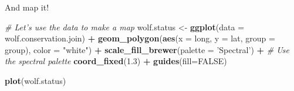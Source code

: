 \documentclass[]{article}
\newenvironment{Shaded}{\begin{snugshade}}{\end{snugshade}}
\newcommand{\CommentTok}[1]{\textcolor[rgb]{0.56,0.35,0.01}{\textit{#1}}}
\newcommand{\DataTypeTok}[1]{\textcolor[rgb]{0.13,0.29,0.53}{#1}}
\newcommand{\FloatTok}[1]{\textcolor[rgb]{0.00,0.00,0.81}{#1}}
\newcommand{\KeywordTok}[1]{\textcolor[rgb]{0.13,0.29,0.53}{\textbf{#1}}}
\newcommand{\NormalTok}[1]{#1}
\newcommand{\OperatorTok}[1]{\textcolor[rgb]{0.81,0.36,0.00}{\textbf{#1}}}
\newcommand{\OtherTok}[1]{\textcolor[rgb]{0.56,0.35,0.01}{#1}}
\newcommand{\StringTok}[1]{\textcolor[rgb]{0.31,0.60,0.02}{#1}}
\begin{document}
And map it!

\begin{Shaded}
\begin{Highlighting}[]
\CommentTok{# Let's use the data to make a map}
\NormalTok{wolf.status <-}\StringTok{ }\KeywordTok{ggplot}\NormalTok{(}\DataTypeTok{data =}\NormalTok{ wolf.conservation.join) }\OperatorTok{+}\StringTok{ }
\StringTok{  }\KeywordTok{geom_polygon}\NormalTok{(}\KeywordTok{aes}\NormalTok{(}\DataTypeTok{x =}\NormalTok{ long, }\DataTypeTok{y =}\NormalTok{ lat, }\DataTypeTok{group =}\NormalTok{ group), }\DataTypeTok{color =} \StringTok{"white"}\NormalTok{) }\OperatorTok{+}\StringTok{ }
\StringTok{  }\KeywordTok{scale_fill_brewer}\NormalTok{(}\DataTypeTok{palette =} \StringTok{'Spectral'}\NormalTok{) }\OperatorTok{+}\StringTok{ }\CommentTok{# Use the spectral palette}
\StringTok{  }\KeywordTok{coord_fixed}\NormalTok{(}\FloatTok{1.3}\NormalTok{) }\OperatorTok{+}
\StringTok{  }\KeywordTok{guides}\NormalTok{(}\DataTypeTok{fill=}\OtherTok{FALSE}\NormalTok{)}
  
\KeywordTok{plot}\NormalTok{(wolf.status)}
\end{Highlighting}
\end{Shaded}
\end{document}
